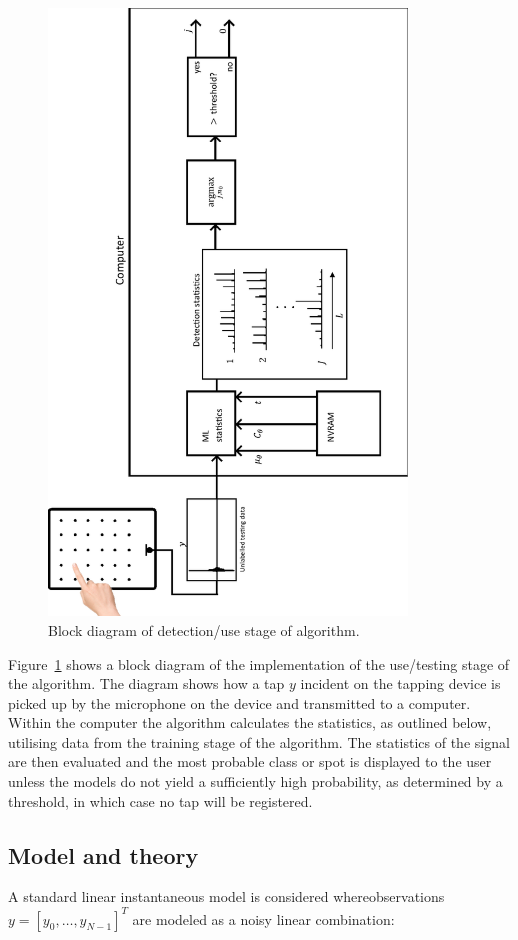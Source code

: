 \begin{figure}[!]
\centering
\includegraphics[width=360px]{testingSystemPlot.pdf}
\caption{Block diagram of detection/use stage of algorithm.}\label{fig:testingSystemPlot}
\end{figure}

Figure~\ref{fig:testingSystemPlot} shows a block diagram of the implementation of the use/testing stage of the algorithm. The diagram shows how a tap $y$ incident on the tapping device is picked up by the microphone on the device and transmitted to a computer. Within the computer the algorithm calculates the statistics, as outlined below, utilising data from the training stage of the algorithm. The statistics of the signal are then evaluated and the most probable class or spot is displayed to the user unless the models do not yield a sufficiently high probability, as determined by a threshold, in which case no tap will be registered.

\subsection{Model and theory}
A standard linear instantaneous model is considered where\linebreak[0] observations \linebreak[2]$y = [y_0, \ldots , y_{N-1}]^T $ are modeled as a noisy linear combination:

